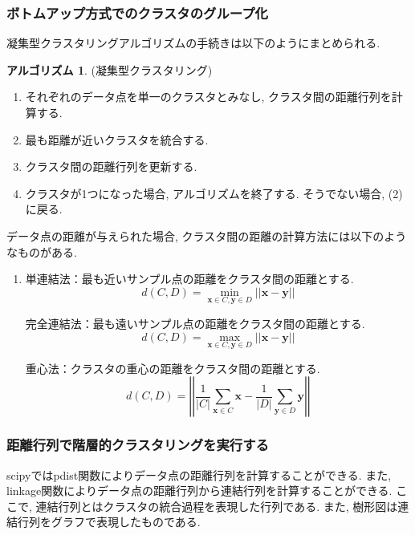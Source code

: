 \documentclass[uplatex]{jsarticle}
\theoremstyle{definition}
\newtheorem{algorithm}[definition]{アルゴリズム}
\numberwithin{equation}{section}
\newcommand{\norm}[1]{\left|\left|#1\right|\right|}
\begin{document}
\subsubsection{ボトムアップ方式でのクラスタのグループ化}
凝集型クラスタリングアルゴリズムの手続きは以下のようにまとめられる.
\begin{algorithm}
    (凝集型クラスタリング)
    \begin{enumerate}
        \item
        それぞれのデータ点を単一のクラスタとみなし, クラスタ間の距離行列を計算する.

        \item
        最も距離が近いクラスタを統合する.

        \item
        クラスタ間の距離行列を更新する.

        \item
        クラスタが1つになった場合, アルゴリズムを終了する.
        そうでない場合, (2)に戻る.
    \end{enumerate}
\end{algorithm}

データ点の距離が与えられた場合, クラスタ間の距離の計算方法には以下のようなものがある.
\begin{enumerate}
    \item
    単連結法：最も近いサンプル点の距離をクラスタ間の距離とする.
    \begin{equation}
        d(C, D) = \min_{\bm{x} \in C, \bm{y} \in D} \norm{\bm{x} - \bm{y}}
    \end{equation}

    完全連結法：最も遠いサンプル点の距離をクラスタ間の距離とする.
    \begin{equation}
        d(C, D) = \max_{\bm{x} \in C, \bm{y} \in D} \norm{\bm{x} - \bm{y}}
    \end{equation}

    重心法：クラスタの重心の距離をクラスタ間の距離とする.
    \begin{equation}
        d(C, D) = \norm{\frac{1}{|C|}\sum_{\bm{x} \in C} \bm{x} - \frac{1}{|D|}\sum_{\bm{y} \in D} \bm{y}}
    \end{equation}
\end{enumerate}

\subsubsection{距離行列で階層的クラスタリングを実行する}
scipyではpdist関数によりデータ点の距離行列を計算することができる.
また, linkage関数によりデータ点の距離行列から連結行列を計算することができる.
ここで, 連結行列とはクラスタの統合過程を表現した行列である.
また, 樹形図は連結行列をグラフで表現したものである.
\end{document}
